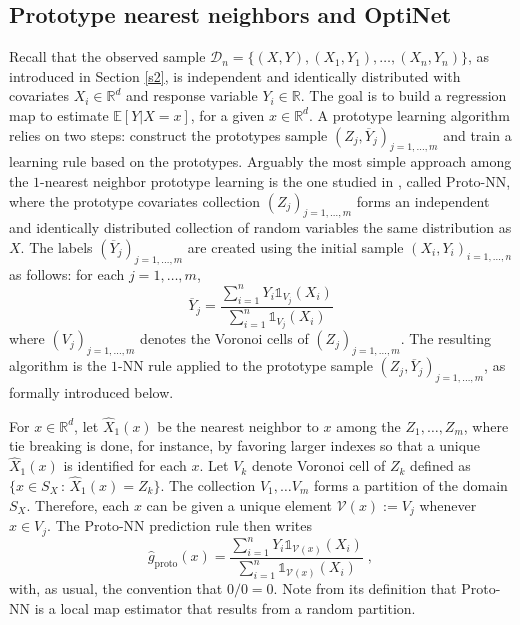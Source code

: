 \documentclass[paper=a4, fontsize=11pt]{scrartcl}
\newcommand{\ind}{\mathds{1}}
\begin{document}
\subsection{Prototype nearest neighbors and OptiNet}\label{s51}

Recall that the observed sample $\mathcal D_n = \{ (X,Y) , (X_1,Y_1),\ldots, (X_n, Y_n) \}  $, as introduced in Section \ref{s2}, is independent and identically distributed with covariates $X_i\in \mathbb R^d$ and response variable $Y_i\in \mathbb R$. The goal is to build a regression map to estimate $\mathbb E [Y|X=x]$, for a given $x\in \mathbb R^d$. A prototype learning algorithm relies on two steps: construct the  prototypes sample $(Z_j,\overline {Y}_j)_{j=1,\ldots, m}$ and train a learning rule based on the prototypes. Arguably the most simple approach among the $1$-nearest neighbor prototype learning is the one studied in \cite{gyorfi2021universal}, called Proto-NN, where the prototype covariates collection $(Z_j)_{j=1,\ldots, m}$ forms an independent and identically distributed collection of random variables 
the same distribution as $X$. The labels $(\overline{Y}_j)_{j=1,\ldots, m}$ are created using the initial sample $(X_i, Y_i) _{i=1,\ldots, n}$ as follows: for each $j=1,\ldots, m$,
$$\overline{Y}_j = \frac{\sum_{i=1} ^n  Y_i \ind_{ V_j } (X_i) }{\sum_{i=1} ^n  \ind_{ V_j } (X_i) } $$ where $(V_j)_{j=1,\ldots, m}$ denotes the Voronoi cells of $(Z_j)_{j=1,\ldots, m}$. The resulting algorithm is the $1$-NN rule applied to the prototype sample $(Z_j,\overline{Y}_j)_{j=1,\ldots, m}$, as formally introduced below.

For $x\in \mathbb R^d$, let $\hat X_1(x)$ be the nearest neighbor to $x$ among the $ Z_1,\ldots, Z_m$, where tie breaking is done, for instance, by favoring larger indexes so that a unique $\hat X_1(x)$ is identified for each $x$. Let $V_k$ denote Voronoi cell of $Z_k$ defined as $ \{x\in S_X \, : \, \hat X_1(x) = Z_k \}$. The collection $V_1,\ldots V_m$ forms a partition of the domain $S_X$. Therefore, each $x$ can be given a unique element $ \mathcal V(x) := V_j$ whenever $x\in V_j $. %
The Proto-NN prediction rule then writes
$$ \hat g _{\textrm{proto}}(x) = \frac{\sum_{i=1} ^n Y_i  \ind_{ \mathcal  V (x) } (X_i )  }{\sum_{i=1} ^n    \ind_{\mathcal  V(x) } (X_i)  }\; ,$$
with, as usual, the convention that $0/0 = 0$. Note from its definition that Proto-NN is a local map estimator that results from a random partition. 
\end{document}
